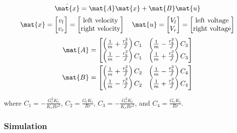 \begin{theorem}
  \begin{equation*}
    \dot{\mat{x}} = \mat{A} \mat{x} + \mat{B} \mat{u}
  \end{equation*}
  \begin{equation*}
    \mat{x} =
    \begin{bmatrix}
      v_l \\
      v_r
    \end{bmatrix} =
    \begin{bmatrix}
      \text{left velocity} \\
      \text{right velocity}
    \end{bmatrix}
    \quad
    \mat{u} =
    \begin{bmatrix}
      V_l \\
      V_r
    \end{bmatrix} =
    \begin{bmatrix}
      \text{left voltage} \\
      \text{right voltage}
    \end{bmatrix}
  \end{equation*}
  \begin{align}
    \mat{A} &=
    \begin{bmatrix}
      \left(\frac{1}{m} + \frac{r_b^2}{J}\right) C_1 & \left(\frac{1}{m} - \frac{r_b^2}{J}\right) C_3 \\
      \left(\frac{1}{m} - \frac{r_b^2}{J}\right) C_1 & \left(\frac{1}{m} + \frac{r_b^2}{J}\right) C_3
    \end{bmatrix} \\
    \mat{B} &=
    \begin{bmatrix}
      \left(\frac{1}{m} + \frac{r_b^2}{J}\right) C_2 & \left(\frac{1}{m} - \frac{r_b^2}{J}\right) C_4 \\
      \left(\frac{1}{m} - \frac{r_b^2}{J}\right) C_2 & \left(\frac{1}{m} + \frac{r_b^2}{J}\right) C_4
    \end{bmatrix}
  \end{align}

  where $C_1 = -\frac{G_l^2 K_t}{K_v R r^2}$, $C_2 = \frac{G_l K_t}{Rr}$,
  $C_3 = -\frac{G_r^2 K_t}{K_v R r^2}$, and $C_4 = \frac{G_r K_t}{Rr}$.
\end{theorem}

\subsubsection{Simulation}

